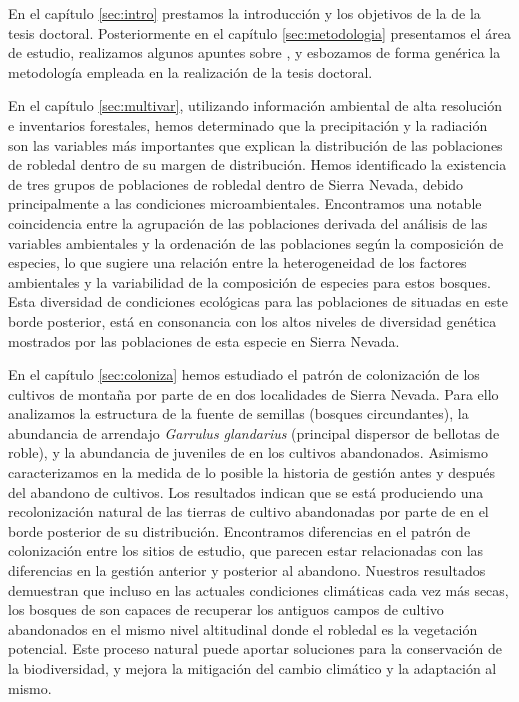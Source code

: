 En el \textcolor{ctcolormain}{capítulo \ref{sec:intro}} prestamos la introducción y los objetivos de la de la tesis doctoral. Posteriormente en el \textcolor{ctcolormain}{capítulo \ref{sec:metodologia}} presentamos el área de estudio, realizamos algunos apuntes sobre \Qp, y esbozamos de forma genérica la metodología empleada en la realización de la tesis doctoral. 

En el \textcolor{ctcolormain}{capítulo \ref{sec:multivar}}, utilizando información ambiental de alta resolución e inventarios forestales, hemos determinado que la precipitación y la radiación son las variables más importantes que explican la distribución de las poblaciones de robledal dentro de su margen de distribución. Hemos identificado la existencia de tres grupos de poblaciones de robledal dentro de Sierra Nevada, debido principalmente a las condiciones microambientales. Encontramos una notable coincidencia entre la agrupación de las poblaciones derivada del análisis de las variables ambientales y la ordenación de las poblaciones según la composición de especies, lo que sugiere una relación entre la heterogeneidad de los factores ambientales y la variabilidad de la composición de especies para estos bosques. Esta diversidad de condiciones ecológicas para las poblaciones de \Qp situadas en este borde posterior, está en consonancia con los altos niveles de diversidad genética mostrados por las poblaciones de esta especie en Sierra Nevada. 

En el \textcolor{ctcolormain}{capítulo \ref{sec:coloniza}} hemos estudiado el patrón de colonización de los cultivos de montaña por parte de \Qp en dos localidades de Sierra Nevada. Para ello analizamos la estructura de la fuente de semillas (bosques circundantes), la abundancia de arrendajo \emph{Garrulus glandarius} (principal dispersor de bellotas de roble), y la abundancia de juveniles de \Qp en los cultivos abandonados. Asimismo caracterizamos en la medida de lo posible la historia de gestión antes y después del abandono de cultivos. Los resultados indican que se está produciendo una recolonización natural de las tierras de cultivo abandonadas por parte de \Qp en el borde posterior de su distribución. Encontramos diferencias en el patrón de colonización entre los sitios de estudio, que parecen estar relacionadas con las diferencias en la gestión anterior y posterior al abandono. Nuestros resultados demuestran que incluso en las actuales condiciones climáticas cada vez más secas, los bosques de \Qp son capaces de recuperar los antiguos campos de cultivo abandonados en el mismo nivel altitudinal donde el robledal es la vegetación potencial. Este proceso natural puede aportar soluciones para la conservación de la biodiversidad, y mejora la mitigación del cambio climático y la adaptación al mismo. 

